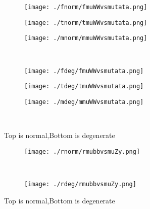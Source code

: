 \documentclass[aps,floats,floatfix,nofootinbib]{revtex4-1}
\begin{document}
\begin{center}
\begin{figure}
\begin{subfigure}{0.3\textwidth}
\texttt{[image: ./fnorm/fmuWWvsmutata.png]}
\label{}
\end{subfigure}
\begin{subfigure}{0.3\textwidth}
\texttt{[image: ./tnorm/tmuWWvsmutata.png]}
\label{}
\end{subfigure}
\begin{subfigure}{0.3\textwidth}
\texttt{[image: ./mnorm/mmuWWvsmutata.png]}
\label{}
\end{subfigure}\\
\begin{subfigure}{0.3\textwidth}
\texttt{[image: ./fdeg/fmuWWvsmutata.png]}
\label{}
\end{subfigure}
\begin{subfigure}{0.3\textwidth}
\texttt{[image: ./tdeg/tmuWWvsmutata.png]}
\label{}
\end{subfigure}
\begin{subfigure}{0.3\textwidth}
\texttt{[image: ./mdeg/mmuWWvsmutata.png]}
\label{}
\end{subfigure}\\
\caption{Top is normal,Bottom is degenerate}
\end{figure}
\end{center}

\begin{center}
\begin{figure}
\begin{subfigure}{1.0\textwidth}
\texttt{[image: ./rnorm/rmubbvsmuZy.png]}
\label{}
\end{subfigure}\\
\begin{subfigure}{1.0\textwidth}
\texttt{[image: ./rdeg/rmubbvsmuZy.png]}
\label{}
\end{subfigure}
\caption{Top is normal,Bottom is degenerate}
\end{figure}
\end{center}
\end{document}
